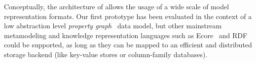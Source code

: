 Conceptually, the architecture of \iqd{} allows the usage of a wide scale of model representation formats. Our first prototype has been evaluated in the context of a low abstraction level \emph{property graph}~\cite{DBLP:journals/corr/abs-1006-2361} data model, but other mainstream metamodeling and knowledge representation languages such as Ecore~\cite{EMF} and RDF~\cite{website:rdf_standard} could be supported, as long as they can be mapped to an efficient and distributed storage backend (like key-value stores or column-family databases).
